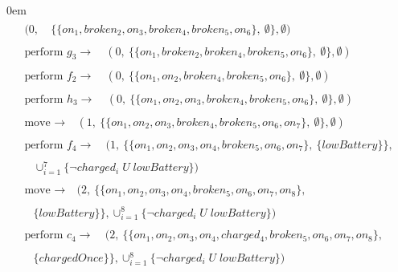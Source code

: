 \documentclass[a4paper,fleqn]{cas-dc}
\begin{document}
\itemsep0em
\scriptsize
\begin{align*}
\begin{split}
(0, & \ \{\{on_1, broken_2, on_3, broken_4, broken_5, on_6\},\ \emptyset\}, \emptyset)
\end{split}
\\\begin{split}
\text{perform } g_3 \to \ & (0, \ \{\{on_1, broken_2, broken_4, broken_5, on_6\},\ \emptyset\}, \emptyset)
\end{split}
\\\begin{split}
\text{perform } f_2 \to \ & (0, \ \{\{on_1, on_2, broken_4, broken_5, on_6\},\ \emptyset\}, \emptyset)
\end{split}
\\\begin{split}
\text{perform } h_3 \to \ & (0, \ \{\{on_1, on_2, on_3, broken_4, broken_5, on_6\},\ \emptyset\}, \emptyset)
\end{split}
\\\begin{split}
\text{move } \to \ & (1, \ \{\{on_1, on_2, on_3, broken_4, broken_5, on_6, on_7\},\ \emptyset\}, \emptyset)
\end{split}
\\\begin{split}
\text{perform } f_4 \to \ & (1, \ \{\{on_1, on_2, on_3, on_4, broken_5, on_6, on_7\},\ \{lowBattery\}\}, 
\end{split} \\
\begin{split}
& \cup_{i=1}^{7}\{\neg charged_i\; U \; lowBattery\})
\end{split}
\\\begin{split}
\text{move } \to \ & (2, \ \{\{on_1, on_2, on_3, on_4, broken_5, on_6, on_7, on_8\},\ 
\end{split}\\
\begin{split}
& \{lowBattery\}\}, \cup_{i=1}^{8}\{\neg  charged_i \; U \; lowBattery\})
\end{split}
\\\begin{split}
\text{perform } c_4 \to \ & (2, \ \{\{on_1, on_2, on_3, on_4, charged_4, broken_5, on_6, on_7, on_8\},\ 
\end{split} \\
\begin{split}
& \{chargedOnce\}\}, \cup_{i=1}^{8}\{\neg charged_i \; U \;  lowBattery\})

\end{split}
\end{align*}
\end{document}
